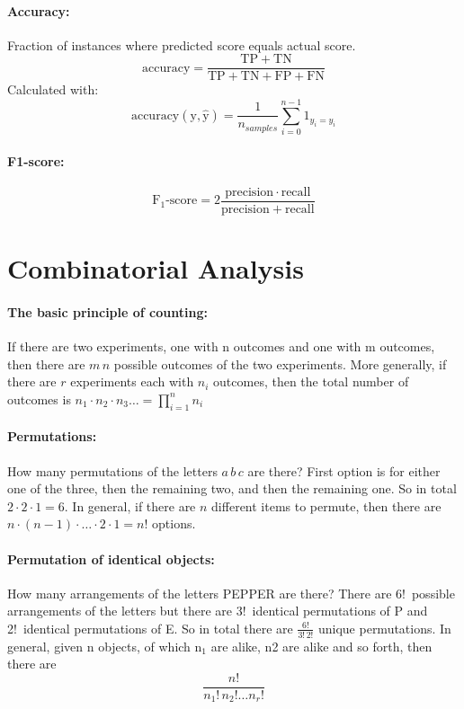 \documentclass[12pt]{article}
\begin{document}
\paragraph{Accuracy: } Fraction of instances where predicted score equals actual score. 
\[
\text{accuracy} = \mathrm{\frac{TP + TN}{TP+TN+FP+FN}}
\]
Calculated with:
\[
\mathrm{accuracy(y,\hat y)} = \frac{1}{n_{samples}} \sum_{i=0}^{n-1} 1_{\hat y_i = y_i}
\]



\paragraph{F1-score:}
\[
\mathrm{F_1\text{-score}} = \mathrm{2 \frac{precision \cdot recall}{precision + recall}}
\]






\section{Combinatorial Analysis}

\paragraph{The basic principle of counting:} If there are two experiments, one with n outcomes and one with m outcomes, then there are $m\,n$ possible outcomes of the two experiments. More generally, if there are $r$ experiments each with $n_i$ outcomes, then the total number of outcomes is $n_1\cdot n_2 \cdot n_3 \dots = \prod_{i = 1}^n n_i$

\paragraph{Permutations:} How many permutations of the letters $a\,b\,c$ are there? First option is for either one of the three, then the remaining two, and then the remaining one. So in total $2\cdot 2\cdot 1 = 6$. In general, if there are $n$ different items to permute, then there are $n\cdot (n-1)\cdot \dots \cdot 2 \cdot 1 = n!$ options.

\paragraph{Permutation of identical objects:} How many arrangements of the letters PEPPER are there? There are 6!\ possible arrangements of the letters but there are 3!\ identical permutations of P and 2!\ identical permutations of E. So in total there are $\frac{6!}{3!\,2!}$ unique permutations. In general, given n objects, of which n$_1$ are alike, n2 are alike and so forth, then there are 
\[
\frac{n!}{n_1! \, n_2! \dots n_r!}
\]
\end{document}
